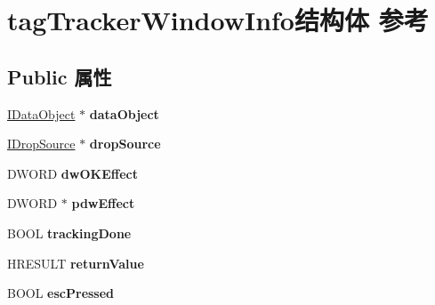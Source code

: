 \hypertarget{structtag_tracker_window_info}{}\section{tag\+Tracker\+Window\+Info结构体 参考}
\label{structtag_tracker_window_info}
\subsection*{Public 属性}
\begin{DoxyCompactItemize}
\item 
\mbox{\label{structtag_tracker_window_info_a9cab6ab0218451d27a98313fee201283}} 
\hyperlink{interface_i_data_object}{I\+Data\+Object} $\ast$ {\bfseries data\+Object}
\item 
\mbox{\label{structtag_tracker_window_info_aabc5f88f42e1f15c449355ced4fae323}} 
\hyperlink{interface_i_drop_source}{I\+Drop\+Source} $\ast$ {\bfseries drop\+Source}
\item 
\mbox{\label{structtag_tracker_window_info_aeb10b72c58489dca0eeaf281b30573e8}} 
D\+W\+O\+RD {\bfseries dw\+O\+K\+Effect}
\item 
\mbox{\label{structtag_tracker_window_info_af185d1b682b64366b24a3064f515f492}} 
D\+W\+O\+RD $\ast$ {\bfseries pdw\+Effect}
\item 
\mbox{\label{structtag_tracker_window_info_a25965bb1cd808876decede048ae51ce8}} 
B\+O\+OL {\bfseries tracking\+Done}
\item 
\mbox{\label{structtag_tracker_window_info_aeab4d770198560cc25b7bff528c7f6c1}} 
H\+R\+E\+S\+U\+LT {\bfseries return\+Value}
\item 
\mbox{\label{structtag_tracker_window_info_ada62db4d84e30900da7fe7a2b22961e5}} 
B\+O\+OL {\bfseries esc\+Pressed}
\item 
\mbox{\label{structtag_tracker_window_info_a2342df69ee284ea0967d5d81e611be91}} 

\end{DoxyCompactItemize}
